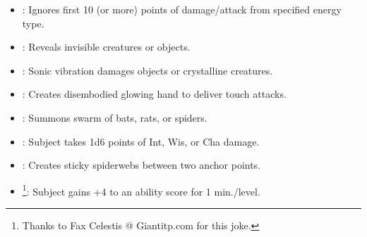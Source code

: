 \begin{itemize}
\item {}: Ignores first 10 (or more) points of damage/attack from specified energy type.
\item {}: Reveals invisible creatures or objects.
\item {}: Sonic vibration damages objects or crystalline creatures.
\item {}: Creates disembodied glowing hand to deliver touch attacks.
\item {}: Summons swarm of bats, rats, or spiders.
\item {}: Subject takes 1d6 points of Int, Wis, or Cha damage.
\item {}: Creates sticky spiderwebs between two anchor points.
\item {}\footnote{Thanks to Fax Celestis @ Giantitp.com for this joke.}: Subject gains +4 to an ability score for 1 min./level.
\end{itemize}

